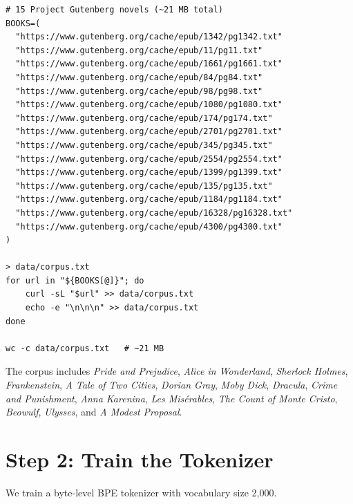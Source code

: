 \begin{lstlisting}[language={}, caption={Download corpus}]
# 15 Project Gutenberg novels (~21 MB total)
BOOKS=(
  "https://www.gutenberg.org/cache/epub/1342/pg1342.txt"
  "https://www.gutenberg.org/cache/epub/11/pg11.txt"
  "https://www.gutenberg.org/cache/epub/1661/pg1661.txt"
  "https://www.gutenberg.org/cache/epub/84/pg84.txt"
  "https://www.gutenberg.org/cache/epub/98/pg98.txt"
  "https://www.gutenberg.org/cache/epub/1080/pg1080.txt"
  "https://www.gutenberg.org/cache/epub/174/pg174.txt"
  "https://www.gutenberg.org/cache/epub/2701/pg2701.txt"
  "https://www.gutenberg.org/cache/epub/345/pg345.txt"
  "https://www.gutenberg.org/cache/epub/2554/pg2554.txt"
  "https://www.gutenberg.org/cache/epub/1399/pg1399.txt"
  "https://www.gutenberg.org/cache/epub/135/pg135.txt"
  "https://www.gutenberg.org/cache/epub/1184/pg1184.txt"
  "https://www.gutenberg.org/cache/epub/16328/pg16328.txt"
  "https://www.gutenberg.org/cache/epub/4300/pg4300.txt"
)

> data/corpus.txt
for url in "${BOOKS[@]}"; do
    curl -sL "$url" >> data/corpus.txt
    echo -e "\n\n\n" >> data/corpus.txt
done

wc -c data/corpus.txt   # ~21 MB
\end{lstlisting}

The corpus includes \emph{Pride and Prejudice}, \emph{Alice in Wonderland}, \emph{Sherlock Holmes}, \emph{Frankenstein}, \emph{A Tale of Two Cities}, \emph{Dorian Gray}, \emph{Moby Dick}, \emph{Dracula}, \emph{Crime and Punishment}, \emph{Anna Karenina}, \emph{Les Mis\'erables}, \emph{The Count of Monte Cristo}, \emph{Beowulf}, \emph{Ulysses}, and \emph{A Modest Proposal}.


\section{Step 2: Train the Tokenizer}
\label{sec:guide-tokenizer}

We train a byte-level BPE tokenizer with vocabulary size 2{,}000.

